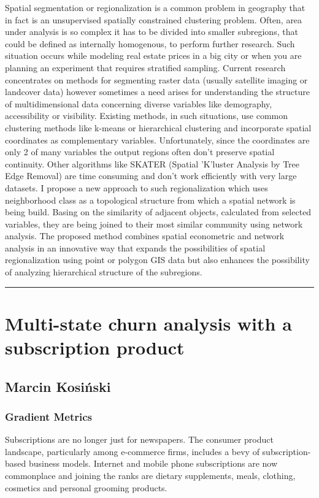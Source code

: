 \documentclass [12pt]{article}
\begin{document}
Spatial segmentation or regionalization is a common problem in geography that in fact is an unsupervised spatially constrained clustering problem. Often, area under analysis is so complex it has to be divided into smaller subregions, that could be defined as internally homogenous, to perform further research. Such situation occurs while modeling real estate prices in a big city or when you are planning an experiment that requires stratified sampling. Current research concentrates on methods for segmenting raster data (usually satellite imaging or landcover data) however sometimes a need arises for understanding the structure of multidimensional data concerning diverse variables like demography, accessibility or visibility. Existing methods, in such situations, use common clustering methods like k-means or hierarchical clustering and incorporate spatial coordinates as complementary variables. Unfortunately, since the coordinates are only 2 of many variables the output regions often don’t preserve spatial continuity. Other algorithms like SKATER (Spatial 'K'luster Analysis by Tree Edge Removal) are time consuming and don’t work efficiently with very large datasets. I propose a new approach to such regionalization which uses neighborhood class as a topological structure from which a spatial network is being build. Basing on the similarity of adjacent objects, calculated from selected variables, they are being joined to their most similar community using network analysis. The proposed method combines spatial econometric and network analysis in an innovative way that expands the possibilities of spatial regionalization using point or polygon GIS data but also enhances the possibility of analyzing hierarchical structure of the subregions.

\noindent\rule{\textwidth}{1pt}
\section{Multi-state churn analysis with a subscription product}
\subsection*{Marcin	Kosiński}
\subsubsection*{Gradient Metrics}

Subscriptions are no longer just for newspapers. The consumer product landscape, particularly among e-commerce firms, includes a bevy of subscription-based business models. Internet and mobile phone subscriptions are now commonplace and joining the ranks are dietary supplements, meals, clothing, cosmetics and personal grooming products.
\end{document}
